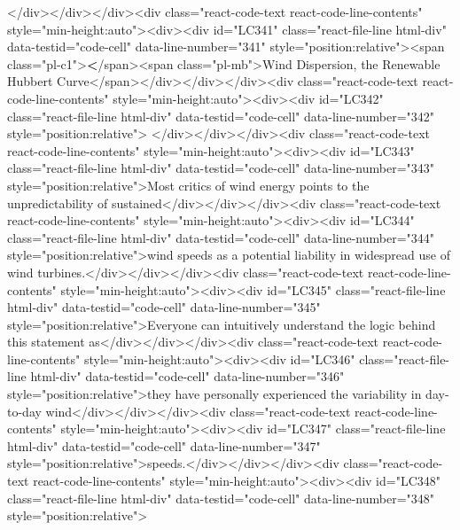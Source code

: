 {{{</div></div></div><div class="react-code-text react-code-line-contents" style="min-height:auto"><div><div id="LC341" class="react-file-line html-div" data-testid="code-cell" data-line-number="341" style="position:relative"><span class="pl-c1">\textbf</span>{<span class="pl-mb">Wind Dispersion, the Renewable Hubbert Curve</span>}</div></div></div><div class="react-code-text react-code-line-contents" style="min-height:auto"><div><div id="LC342" class="react-file-line html-div" data-testid="code-cell" data-line-number="342" style="position:relative">
</div></div></div><div class="react-code-text react-code-line-contents" style="min-height:auto"><div><div id="LC343" class="react-file-line html-div" data-testid="code-cell" data-line-number="343" style="position:relative">Most critics of wind energy points to the unpredictability of sustained</div></div></div><div class="react-code-text react-code-line-contents" style="min-height:auto"><div><div id="LC344" class="react-file-line html-div" data-testid="code-cell" data-line-number="344" style="position:relative">wind speeds as a potential liability in widespread use of wind turbines.</div></div></div><div class="react-code-text react-code-line-contents" style="min-height:auto"><div><div id="LC345" class="react-file-line html-div" data-testid="code-cell" data-line-number="345" style="position:relative">Everyone can intuitively understand the logic behind this statement as</div></div></div><div class="react-code-text react-code-line-contents" style="min-height:auto"><div><div id="LC346" class="react-file-line html-div" data-testid="code-cell" data-line-number="346" style="position:relative">they have personally experienced the variability in day-to-day wind</div></div></div><div class="react-code-text react-code-line-contents" style="min-height:auto"><div><div id="LC347" class="react-file-line html-div" data-testid="code-cell" data-line-number="347" style="position:relative">speeds.</div></div></div><div class="react-code-text react-code-line-contents" style="min-height:auto"><div><div id="LC348" class="react-file-line html-div" data-testid="code-cell" data-line-number="348" style="position:relative">
}}}
